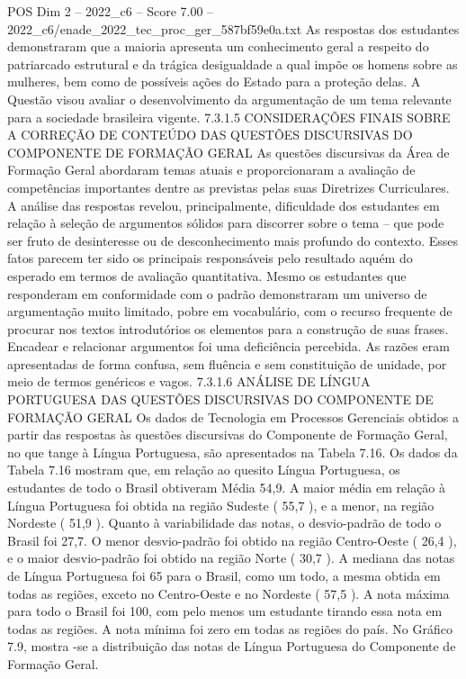 \begin{textsample}{POS Dim 2 – 2022\_c6 – Score 7.00 – 2022\_c6/enade\_2022\_tec\_proc\_ger\_587bf59e0a.txt}
As respostas dos estudantes demonstraram que a maioria apresenta um conhecimento geral a respeito do patriarcado estrutural e da trágica desigualdade a qual impõe os homens sobre as mulheres, bem como de possíveis ações do Estado para a proteção delas.
A Questão visou avaliar o desenvolvimento da argumentação de um tema relevante para a sociedade brasileira vigente. 7.3.1.5 CONSIDERAÇÕES FINAIS SOBRE A CORREÇÃO DE CONTEÚDO DAS QUESTÕES DISCURSIVAS DO COMPONENTE DE FORMAÇÃO GERAL As questões discursivas da Área de Formação Geral abordaram temas atuais e proporcionaram a avaliação de competências importantes dentre as previstas pelas suas Diretrizes Curriculares.
A análise das respostas revelou, principalmente, dificuldade dos estudantes em relação à seleção de argumentos sólidos para discorrer sobre o tema – que pode ser fruto de desinteresse ou de desconhecimento mais profundo do contexto.
Esses fatos parecem ter sido os principais responsáveis pelo resultado aquém do esperado em termos de avaliação quantitativa.
Mesmo os estudantes que responderam em conformidade com o padrão demonstraram um universo de argumentação muito limitado, pobre em vocabulário, com o recurso frequente de procurar nos textos introdutórios os elementos para a construção de suas frases.
Encadear e relacionar argumentos foi uma deficiência percebida.
As razões eram apresentadas de forma confusa, sem fluência e sem constituição de unidade, por meio de termos genéricos e vagos. 7.3.1.6 ANÁLISE DE LÍNGUA PORTUGUESA DAS QUESTÕES DISCURSIVAS DO COMPONENTE DE FORMAÇÃO GERAL Os dados de Tecnologia em Processos Gerenciais obtidos a partir das respostas às questões discursivas do Componente de Formação Geral, no que tange à Língua Portuguesa, são apresentados na Tabela 7.16.
Os dados da Tabela 7.16 mostram que, em relação ao quesito Língua Portuguesa, os estudantes de todo o Brasil obtiveram Média 54,9.
A maior média em relação à Língua Portuguesa foi obtida na região Sudeste ( 55,7 ), e a menor, na região Nordeste ( 51,9 ).
Quanto à variabilidade das notas, o desvio-padrão de todo o Brasil foi 27,7.
O menor desvio-padrão foi obtido na região Centro-Oeste ( 26,4 ), e o maior desvio-padrão foi obtido na região Norte ( 30,7 ).
A mediana das notas de Língua Portuguesa foi 65 para o Brasil, como um todo, a mesma obtida em todas as regiões, exceto no Centro-Oeste e no Nordeste ( 57,5 ).
A nota máxima para todo o Brasil foi 100, com pelo menos um estudante tirando essa nota em todas as regiões.
A nota mínima foi zero em todas as regiões do país.
No Gráfico 7.9, mostra -se a distribuição das notas de Língua Portuguesa do Componente de Formação Geral.

\end{textsample}
